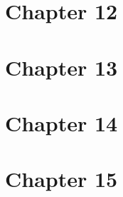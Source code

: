 \documentclass[10pt]{article}
\begin{document}
  \newpage
  \section*{Chapter 12}
  
  
  \newpage
  \section*{Chapter 13}
  
  
  \newpage
  \section*{Chapter 14}
  
  
  \newpage
  \section*{Chapter 15}
  
\end{document}

